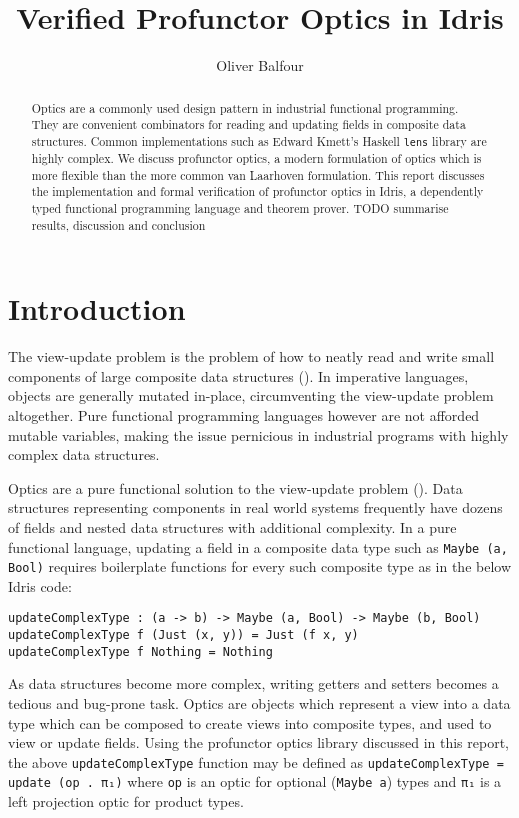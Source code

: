 \documentclass[]{report}
\title{Verified Profunctor Optics in Idris}
\author{Oliver Balfour}
\begin{document}
\maketitle

\begin{abstract}
Optics are a commonly used design pattern in industrial functional programming. They are convenient combinators for reading and updating fields in composite data structures. Common implementations such as Edward Kmett's Haskell \texttt{lens} library are highly complex. We discuss profunctor optics, a modern formulation of optics which is more flexible than the more common van Laarhoven formulation. This report discusses the implementation and formal verification of profunctor optics in Idris, a dependently typed functional programming language and theorem prover. TODO summarise results, discussion and conclusion
\end{abstract}

\tableofcontents
\newpage

\section{Introduction}

The view-update problem is the problem of how to neatly read and write small components of large composite data structures (\cite{foster2005combinators}). In imperative languages, objects are generally mutated in-place, circumventing the view-update problem altogether. Pure functional programming languages however are not afforded mutable variables, making the issue pernicious in industrial programs with highly complex data structures.

Optics are a pure functional solution to the view-update problem (\cite{foster2005combinators}). Data structures representing components in real world systems frequently have dozens of fields and nested data structures with additional complexity. In a pure functional language, updating a field in a composite data type such as \texttt{Maybe (a, Bool)} requires boilerplate functions for every such composite type as in the below Idris code:

\begin{verbatim}
updateComplexType : (a -> b) -> Maybe (a, Bool) -> Maybe (b, Bool)
updateComplexType f (Just (x, y)) = Just (f x, y)
updateComplexType f Nothing = Nothing
\end{verbatim}

As data structures become more complex, writing getters and setters becomes a tedious and bug-prone task. Optics are objects which represent a view into a data type which can be composed to create views into composite types, and used to view or update fields. Using the profunctor optics library discussed in this report, the above \texttt{updateComplexType} function may be defined as \texttt{updateComplexType = update (op . π₁)} where \texttt{op} is an optic for optional (\texttt{Maybe a}) types and \texttt{π₁} is a left projection optic for product types.
\end{document}
